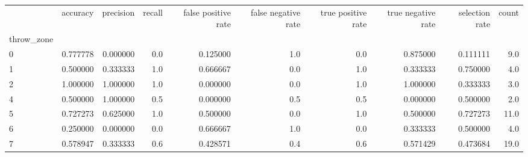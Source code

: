 \begin{tabular}{lrrrrrrrrr}
\toprule
{} &  accuracy &  precision &  recall &  false positive rate &  false negative rate &  true positive rate &  true negative rate &  selection rate &  count \\
throw\_zone &           &            &         &                      &                      &                     &                     &                 &        \\
\midrule
0          &  0.777778 &   0.000000 &     0.0 &             0.125000 &                  1.0 &                 0.0 &            0.875000 &        0.111111 &    9.0 \\
1          &  0.500000 &   0.333333 &     1.0 &             0.666667 &                  0.0 &                 1.0 &            0.333333 &        0.750000 &    4.0 \\
2          &  1.000000 &   1.000000 &     1.0 &             0.000000 &                  0.0 &                 1.0 &            1.000000 &        0.333333 &    3.0 \\
4          &  0.500000 &   1.000000 &     0.5 &             0.000000 &                  0.5 &                 0.5 &            0.000000 &        0.500000 &    2.0 \\
5          &  0.727273 &   0.625000 &     1.0 &             0.500000 &                  0.0 &                 1.0 &            0.500000 &        0.727273 &   11.0 \\
6          &  0.250000 &   0.000000 &     0.0 &             0.666667 &                  1.0 &                 0.0 &            0.333333 &        0.500000 &    4.0 \\
7          &  0.578947 &   0.333333 &     0.6 &             0.428571 &                  0.4 &                 0.6 &            0.571429 &        0.473684 &   19.0 \\
\bottomrule
\end{tabular}
